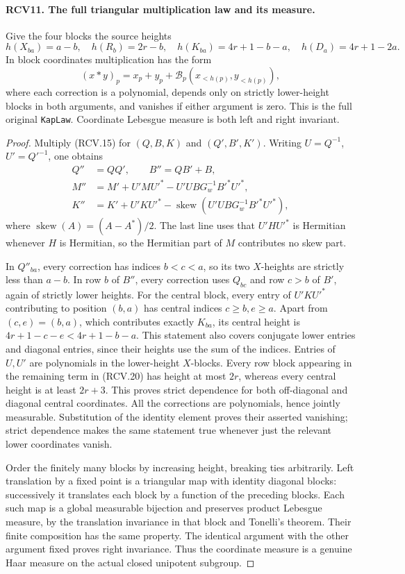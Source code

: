 \documentclass[11pt,a4paper]{article}
\numberwithin{equation}{section}
\theoremstyle{remark}\newtheorem{remark}[theorem]{Remark}
\begin{document}
\paragraph{RCV11. The full triangular multiplication law and its measure.}
\label{claim:RCV11}
Give the four blocks the source heights
\[
 h(X_{ba})=a-b,\quad h(R_b)=2r-b,\quad
 h(K_{ba})=4r+1-b-a,\quad h(D_a)=4r+1-2a.
\tag{RCV.18}
\]
In block coordinates multiplication has the form
\[
       (x*y)_p=x_p+y_p+\mathcal B_p(x_{<h(p)},y_{<h(p)}),
\tag{RCV.19}
\]
where each correction is a polynomial, depends only on strictly
lower-height blocks in both arguments, and vanishes if either
argument is zero.  This is the full original \texttt{Kap\allowbreak Law}.
Coordinate Lebesgue measure is both left and right invariant.
\begin{proof}
Multiply (RCV.15) for \((Q,B,K)\) and \((Q',B',K')\).
Writing \(U=Q^{-1}\), \(U'=Q'^{-1}\), one obtains
\[
 \begin{split}
 Q''&=QQ',\qquad B''=QB'+B,\\
 M''&=M'+U'MU'^*-U'UBG_w^{-1}B'^*U'^*,\\
 K''&=K'+U'KU'^*-\operatorname{skew}
                         (U'UBG_w^{-1}B'^*U'^*),
 \end{split}
\tag{RCV.20}
\]
where \(\operatorname{skew}(A)=(A-A^*)/2\).  The last line
uses that \(U'HU'^*\) is Hermitian whenever \(H\) is Hermitian,
so the Hermitian part of \(M\) contributes no skew part.

In \(Q''_{ba}\), every correction has indices \(b<c<a\),
so its two \(X\)-heights are strictly less than \(a-b\).
In row \(b\) of \(B''\), every correction uses \(Q_{bc}\)
and row \(c>b\) of \(B'\), again of strictly lower heights.
For the central block, every entry of \(U'KU'^*\) contributing
to position \((b,a)\) has central indices \(c\geq b,e\geq a\).
Apart from \((c,e)=(b,a)\), which contributes exactly \(K_{ba}\),
its central height is \(4r+1-c-e<4r+1-b-a\).  This statement
also covers conjugate lower entries and diagonal entries, since their
heights use the sum of the indices.  Entries of \(U,U'\) are
polynomials in the lower-height \(X\)-blocks.  Every row block
appearing in the remaining term in (RCV.20) has height at most
\(2r\), whereas every central height is at least \(2r+3\).
This proves strict dependence for both off-diagonal and diagonal
central coordinates.  All the corrections are polynomials, hence
jointly measurable.  Substitution of the identity element proves
their asserted vanishing; strict dependence makes the same statement
true whenever just the relevant lower coordinates vanish.

Order the finitely many blocks by increasing height, breaking ties
arbitrarily.  Left translation by a fixed point is a triangular
map with identity diagonal blocks: successively it translates each
block by a function of the preceding blocks.  Each such map is a
global measurable bijection and preserves product Lebesgue measure,
by the translation invariance in that block and Tonelli's theorem.
Their finite composition has the same property.  The identical
argument with the other argument fixed proves right invariance.
Thus the coordinate measure is a genuine Haar measure on the actual
closed unipotent subgroup.
\end{proof}
\end{document}
